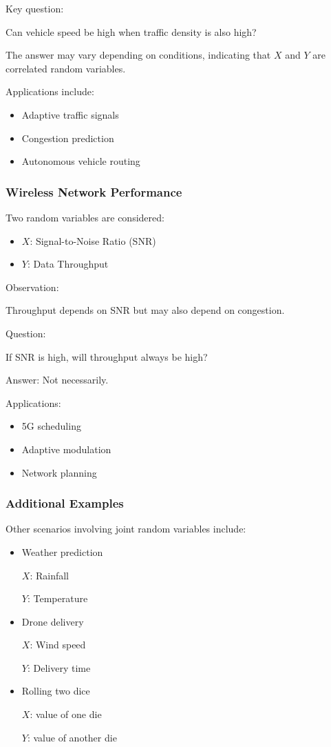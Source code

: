 \documentclass{article}
\begin{document}
Key question:

Can vehicle speed be high when traffic density is also high?

The answer may vary depending on conditions, indicating that $X$ and $Y$ are correlated random variables.

Applications include:

\begin{itemize}
\item Adaptive traffic signals
\item Congestion prediction
\item Autonomous vehicle routing
\end{itemize}

\subsubsection*{Wireless Network Performance}

Two random variables are considered:

\begin{itemize}
\item $X$: Signal-to-Noise Ratio (SNR)
\item $Y$: Data Throughput
\end{itemize}

Observation:

Throughput depends on SNR but may also depend on congestion.

Question:

If SNR is high, will throughput always be high?

Answer: Not necessarily.

Applications:

\begin{itemize}
\item 5G scheduling
\item Adaptive modulation
\item Network planning
\end{itemize}

\subsubsection*{Additional Examples}

Other scenarios involving joint random variables include:

\begin{itemize}
\item Weather prediction

$X$: Rainfall

$Y$: Temperature

\item Drone delivery

$X$: Wind speed

$Y$: Delivery time

\item Rolling two dice

$X$: value of one die

$Y$: value of another die
\end{itemize}
\end{document}

